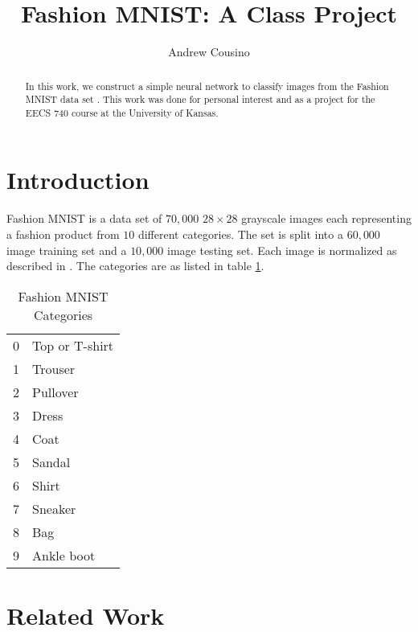\documentclass{IEEEtran}
\title{Fashion MNIST: A Class Project}
\author{Andrew Cousino}
\begin{document}
\maketitle

\begin{abstract}
In this work, we construct a simple neural network to classify images from the
Fashion MNIST data set \cite{xiao2017fashionmnist}. This work was done for
personal interest and as a project for the EECS 740 course at the University
of Kansas.
\end{abstract}

\section{Introduction}
Fashion MNIST \cite{xiao2017fashionmnist} is a data set of \(70,000\)
\(28\times 28\) grayscale images each representing a fashion product from 
\(10\) different categories. The set is split into a \(60,000\) image training
set and a \(10,000\) image testing set. Each image is normalized as described in
\cite{xiao2017fashionmnist}. The categories are as listed in table
\ref{table:categories}.

\begin{table}[h]
    \centering
    \begin{tabular}{rl}
        0 & Top or T-shirt \\
        1 & Trouser \\
        2 & Pullover \\
        3 & Dress \\
        4 & Coat \\
        5 & Sandal \\
        6 & Shirt \\
        7 & Sneaker \\
        8 & Bag \\
        9 & Ankle boot \\
    \end{tabular}
    \caption{Fashion MNIST Categories}
    \label{table:categories}
\end{table}

\section{Related Work}
\nocite{Zhang2019ABR}
\nocite{Dogo_2018}


\end{document}
